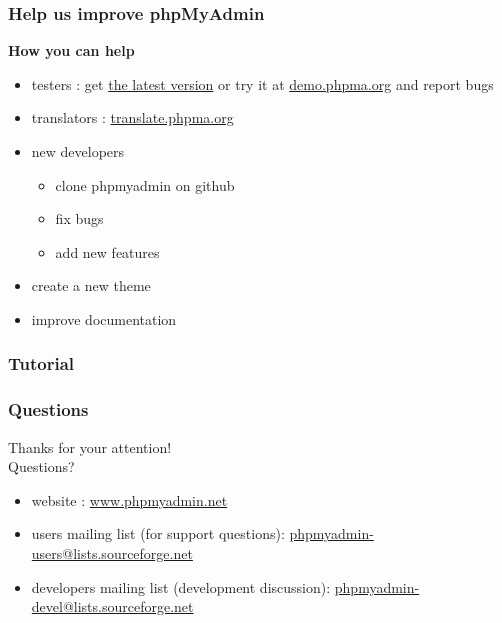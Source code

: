 \documentclass[14pt]{beamer}
\begin{document}
  \begin{frame}
    \frametitle{Help us improve phpMyAdmin}
    \textbf{\color{PmaOlive}How you can help}
    \begin{itemize}
      \item testers : get \href{http://www.phpmyadmin.net/}{the latest version} or try it at \href{http://demo.phpma.org/}{demo.phpma.org} and report bugs
      \item translators : \href{http://translate.phpma.org/}{translate.phpma.org}
      \item new developers
        \begin{itemize}
          \item clone phpmyadmin on github
          \item fix bugs
          \item add new features
        \end{itemize}
      \item create a new theme
      \item improve documentation
    \end{itemize}
  \end{frame}
  \begin{frame}
    \frametitle{Tutorial}
  \end{frame}
  \begin{frame}
    \frametitle{Questions}
    Thanks for your attention!\\
    Questions?
    \begin{itemize}
      \item website : \href{http://www.phpmyadmin.net/}{www.phpmyadmin.net}
      \item users mailing list (for support questions): \href{mailto:phpmyadmin-users@lists.sourceforge.net}{phpmyadmin-users@lists.sourceforge.net}
      \item developers mailing list (development discussion): \href{mailto:phpmyadmin-devel@lists.sourceforge.net}{phpmyadmin-devel@lists.sourceforge.net}
    \end{itemize}
  \end{frame}
\end{document}
